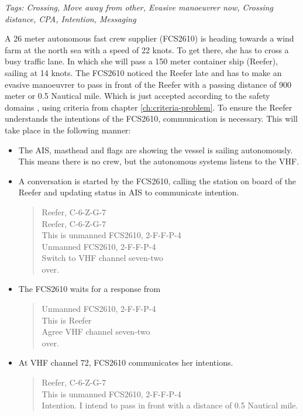 \emph{Tags: Crossing, Move away from other, Evasive manoeuvrer now, Crossing distance, \ac{CPA}, Intention, Messaging}

A 26 meter autonomous fast crew supplier (FCS2610) is heading towards a wind farm at the north sea with a speed of 22 knots. To get there, she has to cross a busy traffic lane. In which she will pass a 150 meter container ship (Reefer), sailing at 14 knots. The FCS2610 noticed the Reefer late and has to make an evasive manoeuvrer to pass in front of the Reefer with a passing distance of 900 meter or 0.5 Nautical mile. Which is just accepted according to the safety domains \cite{Szlapczynski2017a}, using criteria from chapter \ref{ch:criteria-problem}.
To ensure the Reefer understands the intentions of the FCS2610, communication is necessary. This will take place in the following manner:
\begin{itemize}
	\item The \ac{AIS}, masthead and flags are showing the vessel is sailing autonomously. This means there is no crew, but the autonomous systems listens to the \ac{VHF}.
	\item A conversation is started by the FCS2610, calling the station on board of the Reefer and updating status in \ac{AIS} to communicate intention. 
	\begin{quote}
		Reefer, C-6-Z-G-7\\
		Reefer, C-6-Z-G-7\\
		This is unmanned FCS2610, 2-F-F-P-4 \\
		Unmanned FCS2610, 2-F-F-P-4 \\
		Switch to VHF channel seven-two\\
		over.
	\end{quote}
	\item The FCS2610 waits for a response from 
	\begin{quote}
		Unmanned FCS2610, 2-F-F-P-4 \\
		This is Reefer\\
		Agree VHF channel seven-two\\
		over.
	\end{quote}
	\item At \ac{VHF} channel 72, FCS2610 communicates her intentions.
	\begin{quote}
		Reefer, C-6-Z-G-7\\
		This is unmanned FCS2610, 2-F-F-P-4 \\
		Intention. I intend to pass in front with a distance of 0.5 Nautical mile.\\

\end{quote}
\end{itemize}
